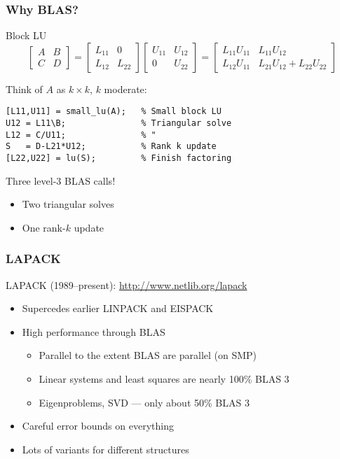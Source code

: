 \documentclass{beamer}
\begin{document}
\begin{frame}[fragile]
  \frametitle{Why BLAS?}

  Block LU
  \[
  \begin{bmatrix}
    A & B \\
    C & D
  \end{bmatrix} = 
  \begin{bmatrix}
    L_{11} & 0 \\
    L_{12} & L_{22} 
  \end{bmatrix}
  \begin{bmatrix}
    U_{11} & U_{12} \\
    0 & U_{22} 
  \end{bmatrix} =
  \begin{bmatrix}
    L_{11} U_{11} & L_{11} U_{12} \\
    L_{12} U_{11} & L_{21} U_{12} + L_{22} U_{22}
  \end{bmatrix}
  \]

Think of $A$ as $k \times k$, $k$ moderate:
\begin{lstlisting}
[L11,U11] = small_lu(A);   % Small block LU
U12 = L11\B;               % Triangular solve
L12 = C/U11;               % "
S   = D-L21*U12;           % Rank k update
[L22,U22] = lu(S);         % Finish factoring
\end{lstlisting}
Three level-3 BLAS calls!
\begin{itemize}
\item Two triangular solves
\item One rank-$k$ update
\end{itemize}

\end{frame}


\begin{frame}
  \frametitle{LAPACK}

  LAPACK (1989--present): \url{http://www.netlib.org/lapack}
  \begin{itemize}
  \item Supercedes earlier LINPACK and EISPACK
  \item High performance through BLAS
    \begin{itemize}
    \item Parallel to the extent BLAS are parallel (on SMP)
    \item Linear systems and least squares are nearly 100\% BLAS 3
    \item Eigenproblems, SVD --- only about 50\% BLAS 3
    \end{itemize}
  \item Careful error bounds on everything
  \item Lots of variants for different structures
  \end{itemize}
    
\end{frame}
\end{document}
